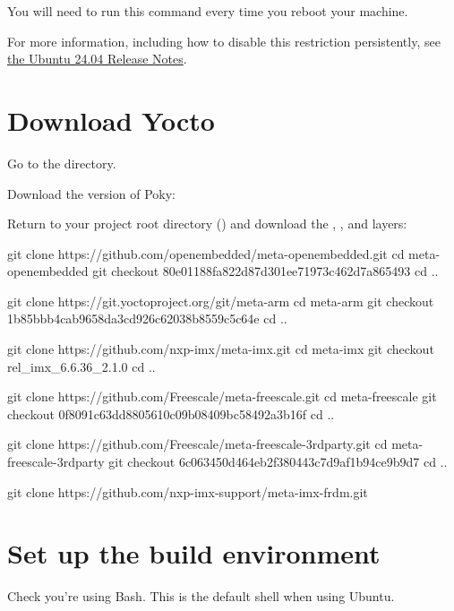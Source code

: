 You will need to run this command every time you reboot your machine.

For more information, including how to disable this restriction
persistently, see
\href{https://discourse.ubuntu.com/t/ubuntu-24-04-lts-noble-numbat-release-notes/39890#p-99950-unprivileged-user-namespace-restrictions}
     {the Ubuntu 24.04 Release Notes}.

\section{Download Yocto}

Go to the  directory.

Download the  version of Poky:

Return to your project root directory ()
and download the , ,  and  layers:
\begin{bashinput}
git clone https://github.com/openembedded/meta-openembedded.git
cd meta-openembedded
git checkout 80e01188fa822d87d301ee71973c462d7a865493
cd ..

git clone https://git.yoctoproject.org/git/meta-arm
cd meta-arm
git checkout 1b85bbb4cab9658da3cd926c62038b8559c5c64e
cd ..

git clone https://github.com/nxp-imx/meta-imx.git
cd meta-imx
git checkout rel_imx_6.6.36_2.1.0
cd ..

git clone https://github.com/Freescale/meta-freescale.git
cd meta-freescale
git checkout 0f8091c63dd8805610c09b08409bc58492a3b16f
cd ..

git clone https://github.com/Freescale/meta-freescale-3rdparty.git
cd meta-freescale-3rdparty
git checkout 6c063450d464eb2f380443c7d9af1b94ce9b9d7
cd ..

git clone https://github.com/nxp-imx-support/meta-imx-frdm.git
\end{bashinput}

\section{Set up the build environment}

Check you're using Bash. This is the default shell when using Ubuntu.

